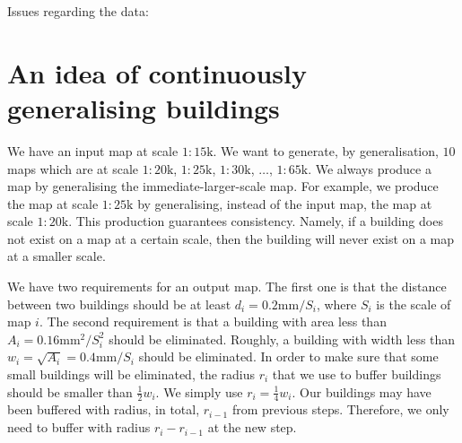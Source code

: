 \documentclass[graybox]{svmult}
\begin{document}
Issues regarding the data:

%

\clearpage


\section{An idea of continuously generalising buildings}
We have an input map at scale $1:15 \mathrm{k}$.
We want to generate, by generalisation, $10$ maps which are at 
scale $1:20\mathrm{k}$, $1:25\mathrm{k}$, 
$1:30\mathrm{k}$, $\dots$, $1:65\mathrm{k}$.
We always produce a map by generalising the 
immediate-larger-scale map. For example, we produce the map at 
scale $1:25\mathrm{k}$ by generalising, instead of the input 
map, the map at scale $1:20\mathrm{k}$.
This production 
guarantees consistency. Namely, if a building does not exist on 
a map at a certain scale, then the building will never exist on 
a map at a smaller scale.

We have two requirements for an output map.
The first one is that the distance between two 
buildings should be at least $d_i=0.2 \mathrm{mm}/S_i$, where 
$S_i$ is the scale of map $i$.
The second requirement is that a building with area less than 
$A_i=0.16\mathrm{mm}^2/S^2_i$ should be eliminated. Roughly, a 
building with width less than 
$w_i=\sqrt{A_i}=0.4\mathrm{mm}/S_i$ should be eliminated.
In order to make sure that some small buildings will be 
eliminated, the radius $r_i$ that we use to buffer buildings 
should be smaller than $\frac{1}{2}w_i$. We simply use 
$r_i=\frac{1}{4}w_i$.
Our buildings may have been buffered with radius, in total, 
$r_{i-1}$ from previous steps.
Therefore, we only need to buffer with radius $r_i-r_{i-1}$ at 
the new 
step.
\end{document}
